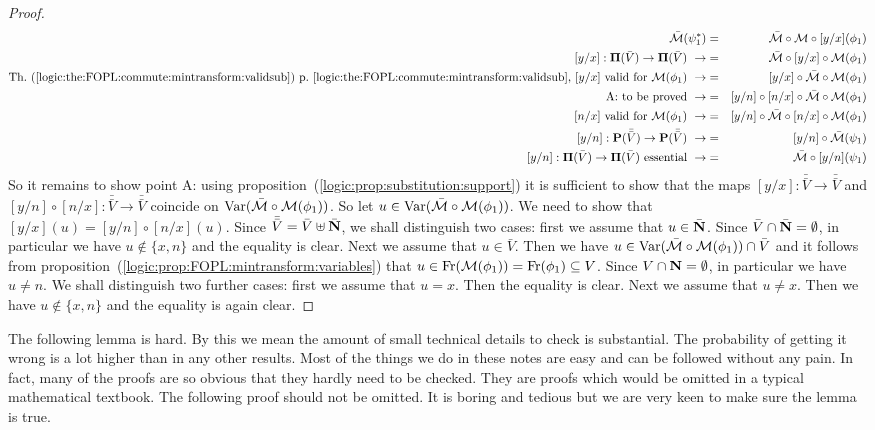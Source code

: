 \begin{proof}
\begin{eqnarray*}
    \bar{\cal M}(\psi_{1}^{*})&=&\bar{\cal M}\circ{\cal
    M}\circ[y/x](\phi_{1})\\
    \mbox{$[y/x]:\pvb\to\pvb$}\ \rightarrow
    &=&\bar{\cal M}\circ[y/x]\circ{\cal M}(\phi_{1})\\
    \mbox{Th.~(\ref{logic:the:FOPL:commute:mintransform:validsub})
    p.~\pageref{logic:the:FOPL:commute:mintransform:validsub}, $[y/x]$ valid for ${\cal M}(\phi_{1})$}
    \ \rightarrow&=&[y/x]\circ\bar{\cal M}\circ{\cal M}(\phi_{1})\\
    \mbox{A: to be proved}\ \rightarrow
    &=&[y/n]\circ[n/x]\circ\bar{\cal M}\circ{\cal M}(\phi_{1})\\
    \mbox{$[n/x]$ valid for ${\cal M}(\phi_{1})$}
    \ \rightarrow&=&[y/n]\circ\bar{\cal M}\circ[n/x]\circ{\cal M}(\phi_{1})\\
    \mbox{$[y/n]:{\bf P}(\bar{\bar{V}})\to{\bf P}(\bar{\bar{V}})$}\ \rightarrow
    &=&[y/n]\circ\bar{\cal M}(\psi_{1})\\
    \mbox{$[y/n]:\pvb\to\pvb$ essential}\ \rightarrow
    &=&\bar{\cal M}\circ[y/n](\psi_{1})
    \end{eqnarray*}
So it remains to show point A: using
proposition~(\ref{logic:prop:substitution:support}) it is sufficient
to show that the maps $[y/x]:\bar{\bar{V}}\to\bar{\bar{V}}$ and
$[y/n]\circ[n/x]:\bar{\bar{V}}\to\bar{\bar{V}}$ coincide on
$\mbox{\rm Var}(\bar{\cal M}\circ{\cal M}(\phi_{1}))$. So let
$u\in\mbox{\rm Var}(\bar{\cal M}\circ{\cal M}(\phi_{1}))$. We need to show
that $[y/x](u)=[y/n]\circ[n/x](u)$. Since
$\bar{\bar{V}}=\bar{V}\uplus\bar{\mbox{$\bf N$}}$, we shall distinguish two
cases: first we assume that $u\in\bar{\mbox{$\bf N$}}$. Since
$\bar{V}\cap\bar{\mbox{$\bf N$}}=\emptyset$, in particular we have
$u\not\in\{x,n\}$ and the equality is clear. Next we assume that
$u\in\bar{V}$. Then we have $u\in\mbox{\rm Var}(\bar{\cal M}\circ{\cal
M}(\phi_{1}))\cap\bar{V}$ and it follows from
proposition~(\ref{logic:prop:FOPL:mintransform:variables}) that
$u\in\mbox{\rm Fr}({\cal M}(\phi_{1}))=\mbox{\rm Fr}(\phi_{1})\subseteq V$. Since
$V\cap\mbox{$\bf N$}=\emptyset$, in particular we have $u\neq n$. We shall
distinguish two further cases: first we assume that $u=x$. Then the
equality is clear. Next we assume that $u\neq x$. Then we have
$u\not\in\{x,n\}$ and the equality is again clear.
\end{proof}

The following lemma is hard. By this we mean the amount of small
technical details to check is substantial. The probability of
getting it wrong is a lot higher than in any other results. Most of
the things we do in these notes are easy and can be followed without
any pain. In fact, many of the proofs are so obvious that they
hardly need to be checked. They are proofs which would be omitted in
a typical mathematical textbook. The following proof should not be
omitted. It is boring and tedious but we are very keen to make sure
the lemma is true.

